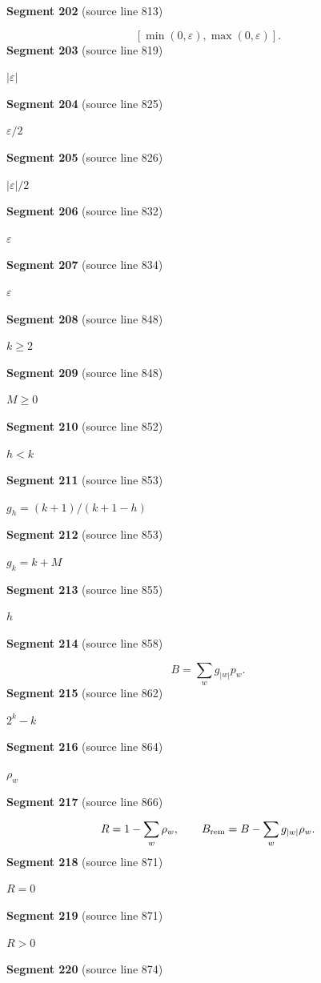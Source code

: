 \documentclass[11pt]{article}
\begin{document}
\textbf{Segment 202} (source line 813)\par
\[
[\min(0,\varepsilon),\max(0,\varepsilon)].
\tag{15}
\]
\textbf{Segment 203} (source line 819)\par
\( |\varepsilon| \)\par
\textbf{Segment 204} (source line 825)\par
\( \varepsilon/2 \)\par
\textbf{Segment 205} (source line 826)\par
\( |\varepsilon|/2 \)\par
\textbf{Segment 206} (source line 832)\par
\( \varepsilon \)\par
\textbf{Segment 207} (source line 834)\par
\( \varepsilon \)\par
\textbf{Segment 208} (source line 848)\par
\( k\ge2 \)\par
\textbf{Segment 209} (source line 848)\par
\( M\ge0 \)\par
\textbf{Segment 210} (source line 852)\par
\( h<k \)\par
\textbf{Segment 211} (source line 853)\par
\( g_h=(k+1)/(k+1-h) \)\par
\textbf{Segment 212} (source line 853)\par
\( g_k=k+M \)\par
\textbf{Segment 213} (source line 855)\par
\( h \)\par
\textbf{Segment 214} (source line 858)\par
\[
B=\sum_w g_{|w|}p_w.
\]
\textbf{Segment 215} (source line 862)\par
\( 2^k-k \)\par
\textbf{Segment 216} (source line 864)\par
\( \rho_w \)\par
\textbf{Segment 217} (source line 866)\par
\[
R=1-\sum_w\rho_w,\qquad
B_{\rm rem}=B-\sum_w g_{|w|}\rho_w.
\]
\textbf{Segment 218} (source line 871)\par
\( R=0 \)\par
\textbf{Segment 219} (source line 871)\par
\( R>0 \)\par
\textbf{Segment 220} (source line 874)\par
\end{document}
